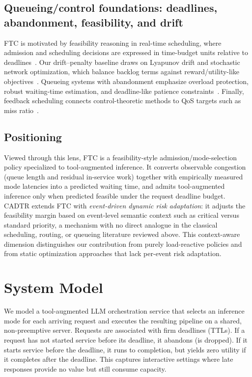 \documentclass[fleqn,12pt,lineno]{wlpeerj}
\begin{document}
\subsection{Queueing/control foundations: deadlines, abandonment, feasibility, and drift}
FTC is motivated by feasibility reasoning in real-time scheduling, where admission and scheduling decisions are expressed in time-budget units relative to deadlines~\cite{liu1973scheduling,lopez2004edfmp}. Our drift--penalty baseline draws on Lyapunov drift and stochastic network optimization, which balance backlog terms against reward/utility-like objectives~\cite{neely2010stochastic}. Queueing systems with abandonment emphasize overload protection, robust waiting-time estimation, and deadline-like patience constraints~\cite{whitt2006fluid, ibrahim2009delay, abandonmentra}. Finally, feedback scheduling connects control-theoretic methods to QoS targets such as miss ratio~\cite{lu1999case,lu2001feedback,hellerstein2004feedback}.

\subsection{Positioning}
Viewed through this lens, FTC is a feasibility-style admission/mode-selection policy specialized to tool-augmented inference. It converts observable congestion (queue length and residual in-service work) together with empirically measured mode latencies into a predicted waiting time, and admits tool-augmented inference only when predicted feasible under the request deadline budget. CADTR extends FTC with \emph{event-driven dynamic risk adaptation}: it adjusts the feasibility margin based on event-level semantic context such as critical versus standard priority, a mechanism with no direct analogue in the classical scheduling, routing, or queueing literature reviewed above. This context-aware dimension distinguishes our contribution from purely load-reactive policies and from static optimization approaches that lack per-event risk adaptation.

\section{System Model}
\label{sec:model}

We model a tool-augmented LLM orchestration service that selects an inference mode for each arriving request and executes the resulting pipeline on a shared, non-preemptive server. Requests are associated with firm deadlines (TTLs). If a request has not started service before its deadline, it abandons (is dropped). If it starts service before the deadline, it runs to completion, but yields zero utility if it completes after the deadline. This captures interactive settings where late responses provide no value but still consume capacity.
\end{document}
